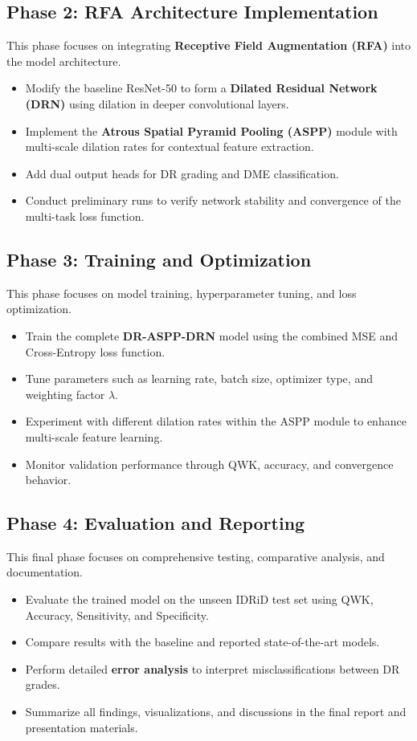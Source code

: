 \documentclass[12pt,a4paper]{article}
\begin{document}
\subsection{Phase 2: RFA Architecture Implementation}
This phase focuses on integrating \textbf{Receptive Field Augmentation (RFA)} into the model architecture.
\begin{itemize}[noitemsep, topsep=0pt]
    \item Modify the baseline ResNet-50 to form a \textbf{Dilated Residual Network (DRN)} using dilation in deeper convolutional layers.
    \item Implement the \textbf{Atrous Spatial Pyramid Pooling (ASPP)} module with multi-scale dilation rates for contextual feature extraction.
    \item Add dual output heads for DR grading and DME classification.
    \item Conduct preliminary runs to verify network stability and convergence of the multi-task loss function.
\end{itemize}

\subsection{Phase 3: Training and Optimization}
This phase focuses on model training, hyperparameter tuning, and loss optimization.
\begin{itemize}[noitemsep, topsep=0pt]
    \item Train the complete \textbf{DR-ASPP-DRN} model using the combined MSE and Cross-Entropy loss function.
    \item Tune parameters such as learning rate, batch size, optimizer type, and weighting factor $\lambda$.
    \item Experiment with different dilation rates within the ASPP module to enhance multi-scale feature learning.
    \item Monitor validation performance through QWK, accuracy, and convergence behavior.
\end{itemize}

\subsection{Phase 4: Evaluation and Reporting}
This final phase focuses on comprehensive testing, comparative analysis, and documentation.
\begin{itemize}[noitemsep, topsep=0pt]
    \item Evaluate the trained model on the unseen IDRiD test set using QWK, Accuracy, Sensitivity, and Specificity.
    \item Compare results with the baseline and reported state-of-the-art models.
    \item Perform detailed \textbf{error analysis} to interpret misclassifications between DR grades.
    \item Summarize all findings, visualizations, and discussions in the final report and presentation materials.
\end{itemize}
\end{document}
